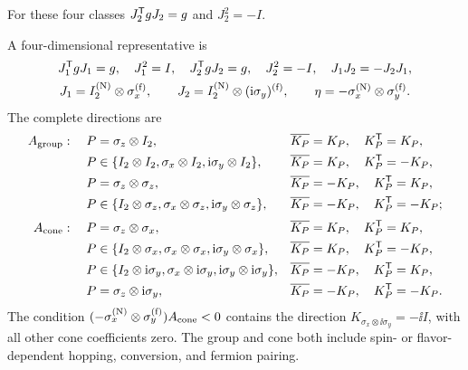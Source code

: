 For these four classes \(J_2^{\mathsf{T}} gJ_2=g\) and \(J_2^2=-I\).

A four-dimensional representative is
\begin{equation}
\begin{gathered}
J_1^{\mathsf{T}} gJ_1=g,\quad J_1^2=I,\quad
J_2^{\mathsf{T}} gJ_2=g,\quad J_2^2=-I,\quad
J_1J_2=-J_2J_1,\\
J_1=I_2^{({\rm N})}\otimes\sigma_x^{({\rm f})},\qquad
J_2=I_2^{({\rm N})}\otimes(\mathrm{i}\sigma_y)^{({\rm f})},\qquad
\eta=-\sigma_x^{({\rm N})}\otimes\sigma_y^{({\rm f})}.
\end{gathered}
\end{equation}
The complete directions are
\begin{align*}
A_{\rm group}:\quad
P&=\sigma_z\otimes I_2,&&\overline{K_P}=K_P,\quad K_P^{\mathsf{T}}=K_P,\\
P&\in\{I_2\otimes I_2,\sigma_x\otimes I_2,
\mathrm{i}\sigma_y\otimes I_2\},&&\overline{K_P}=K_P,\quad K_P^{\mathsf{T}}=-K_P,\\
P&=\sigma_z\otimes\sigma_z,&&\overline{K_P}=-K_P,\quad K_P^{\mathsf{T}}=K_P,\\
P&\in\{I_2\otimes\sigma_z,\sigma_x\otimes\sigma_z,
\mathrm{i}\sigma_y\otimes\sigma_z\},&&\overline{K_P}=-K_P,\quad K_P^{\mathsf{T}}=-K_P;\\[2pt]
A_{\rm cone}:\quad
P&=\sigma_z\otimes\sigma_x,&&\overline{K_P}=K_P,\quad K_P^{\mathsf{T}}=K_P,\\
P&\in\{I_2\otimes\sigma_x,\sigma_x\otimes\sigma_x,
\mathrm{i}\sigma_y\otimes\sigma_x\},&&\overline{K_P}=K_P,\quad K_P^{\mathsf{T}}=-K_P,\\
P&\in\{I_2\otimes\mathrm{i}\sigma_y,\sigma_x\otimes\mathrm{i}\sigma_y,
\mathrm{i}\sigma_y\otimes\mathrm{i}\sigma_y\},&&\overline{K_P}=-K_P,\quad K_P^{\mathsf{T}}=K_P,\\
P&=\sigma_z\otimes\mathrm{i}\sigma_y,&&\overline{K_P}=-K_P,\quad K_P^{\mathsf{T}}=-K_P.
\end{align*}
The condition \((-\sigma_x^{({\rm N})}\otimes\sigma_y^{({\rm f})})A_{\rm cone}<0\) contains the direction
\(K_{\sigma_x\otimes\ii\sigma_y}=-\ii I\), with all other cone coefficients zero.  The group and cone both include spin- or flavor-dependent hopping, conversion, and fermion pairing.

